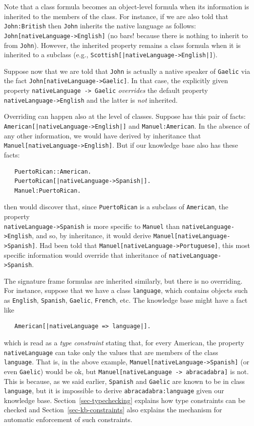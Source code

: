 \documentclass[11pt]{article}
\newcommand{\ERGO}{\mbox{\smaller{\ensuremath{\cal{E}}\smaller{{\sc{RGO}}}}}\xspace}
\newcommand{\FLSYSTEM}{\ERGO}
\begin{document}
  Note that a class formula becomes an object-level formula when its
  information is inherited to the members of the class. For instance, if we
  are also told that \texttt{John:British} then \texttt{John} inherits the
  native language as follows:  
  \texttt{John[nativeLanguage->English]} (no bars! because there is
  nothing to inherit to from \texttt{John}).
  However, the inherited property remains a class formula
  when it is inherited to a subclass (e.g.,
  \texttt{Scottish[|nativeLanguage->English|]}).

Suppose now that we are told that \texttt{John} is actually a native
speaker of \texttt{Gaelic} via the fact   \texttt{John[nativeLanguage->Gaelic]}.
In that case, the explicitly given property \texttt{nativeLanguage -> Gaelic}
\emph{overrides} the default property \texttt{nativeLanguage->English}  and
the latter is \emph{not} inherited.

Overriding can happen also at the level of classes. Suppose \FLSYSTEM has
this pair of facts: \texttt{American[|nativeLanguage->English|]} and
\texttt{Manuel:American}. In the absence of any other information, we
would have derived by inheritance that
\texttt{Manuel[nativeLanguage->English]}.
But if our knowledge base also has these facts:
\begin{verbatim}
   PuertoRican::American.
   PuertoRican[|nativeLanguage->Spanish|].
   Manuel:PuertoRican.
\end{verbatim}
then \FLSYSTEM would discover that, since \texttt{PuertoRican} is a
subclass of \texttt{American}, the property
\\
\texttt{nativeLanguage->Spanish}  is more specific to \texttt{Manuel} than
\texttt{nativeLanguage->English}, and so, by inheritance,  it would derive 
\texttt{Manuel[nativeLanguage->Spanish]}.
Had \FLSYSTEM been told that \texttt{Manuel[nativeLanguage->Portuguese]},
this
most specific information would override that inheritance of
\texttt{nativeLanguage->Spanish}.

The signature frame formulas are inherited similarly, but there is no
overriding. For instance, suppose that we have a class \texttt{language},
which contains objects such as \texttt{English}, \texttt{Spanish},
\texttt{Gaelic}, 
\texttt{French}, etc. The knowledge base might have a fact like
\begin{verbatim}
   American[|nativeLanguage => language|].
\end{verbatim}
which is read as a \emph{type constraint} stating that, for every American,
the property \texttt{nativeLanguage} can take only the values that are
members of the class \texttt{language}. That is, in the above example,
\texttt{Manuel[nativeLanguage->Spanish]} (or even \texttt{Gaelic})
would be ok, but \texttt{Manuel[nativeLanguage -> abracadabra]} is not. This
is because, as we said earlier, \texttt{Spanish} and \texttt{Gaelic} are 
known to be in class \texttt{language}, but it is impossible to derive
\texttt{abracadabra:language} given our knowledge
base.
Section~\ref{sec-typechecking} explains how type constraints can be
checked and Section~\ref{sec-kb-constraints} also explains the mechanism for
automatic enforcement of such constraints.
\end{document}

